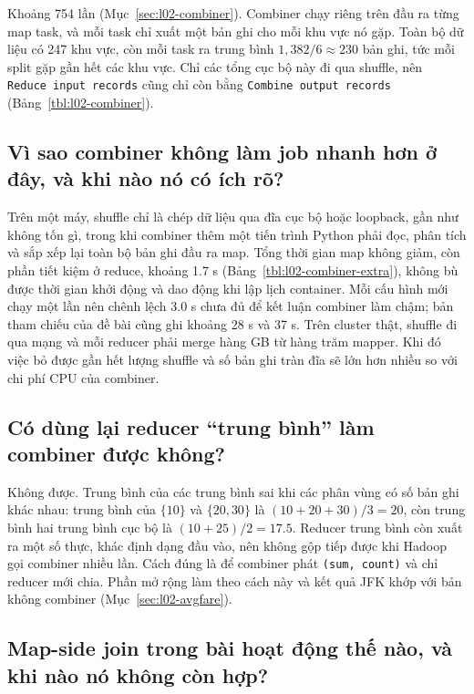 \documentclass[
  12pt,
  a4paper,
]{article}
\begin{document}
Khoảng 754 lần (Mục~\ref{sec:l02-combiner}). Combiner chạy riêng trên
đầu ra từng map task, và mỗi task chỉ xuất một bản ghi cho mỗi khu vực
nó gặp. Toàn bộ dữ liệu có 247 khu vực, còn mỗi task ra trung bình
\(1{,}382 / 6 \approx 230\) bản ghi, tức mỗi split gặp gần hết các khu
vực. Chỉ các tổng cục bộ này đi qua shuffle, nên
\texttt{Reduce\ input\ records}\allowbreak{} cũng chỉ còn bằng
\texttt{Combine\ output\ records}\allowbreak{}
(Bảng~\ref{tbl:l02-combiner}).

\subsection{Vì sao combiner không làm job nhanh hơn ở đây, và khi nào nó
có ích rõ?}\label{sec:l02-q5}

Trên một máy, shuffle chỉ là chép dữ liệu qua đĩa cục bộ hoặc loopback,
gần như không tốn gì, trong khi combiner thêm một tiến trình Python phải
đọc, phân tích và sắp xếp lại toàn bộ bản ghi đầu ra map. Tổng thời gian
map không giảm, còn phần tiết kiệm ở reduce, khoảng 1.7 s
(Bảng~\ref{tbl:l02-combiner-extra}), không bù được thời gian khởi động
và dao động khi lập lịch container. Mỗi cấu hình mới chạy một lần nên
chênh lệch 3.0 s chưa đủ để kết luận combiner làm chậm; bản tham chiếu
của đề bài cũng ghi khoảng 28 s và 37 s. Trên cluster thật, shuffle đi
qua mạng và mỗi reducer phải merge hàng GB từ hàng trăm mapper. Khi đó
việc bỏ được gần hết lượng shuffle và số bản ghi tràn đĩa sẽ lớn hơn
nhiều so với chi phí CPU của combiner.

\subsection{Có dùng lại reducer ``trung bình'' làm combiner được
không?}\label{sec:l02-q6}

Không được. Trung bình của các trung bình sai khi các phân vùng có số
bản ghi khác nhau: trung bình của \(\{10\}\) và \(\{20, 30\}\) là
\((10+20+30)/3 = 20\), còn trung bình hai trung bình cục bộ là
\((10 + 25)/2 = 17.5\). Reducer trung bình còn xuất ra một số thực, khác
định dạng đầu vào, nên không gộp tiếp được khi Hadoop gọi combiner nhiều
lần. Cách đúng là để combiner phát \texttt{(sum,\ count)} và chỉ reducer
mới chia. Phần mở rộng làm theo cách này và kết quả JFK khớp với bản
không combiner (Mục~\ref{sec:l02-avgfare}).

\subsection{Map-side join trong bài hoạt động thế nào, và khi nào nó
không còn hợp?}\label{sec:l02-q7}
\end{document}
